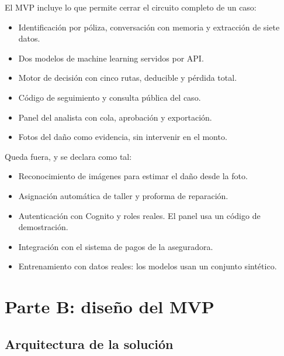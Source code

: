 \documentclass[12pt,letterpaper]{article}
\begin{document}
El MVP incluye lo que permite cerrar el circuito completo de un caso:

\begin{itemize}[itemsep=2pt]
  \item Identificación por póliza, conversación con memoria y extracción de siete datos.
  \item Dos modelos de machine learning servidos por API.
  \item Motor de decisión con cinco rutas, deducible y pérdida total.
  \item Código de seguimiento y consulta pública del caso.
  \item Panel del analista con cola, aprobación y exportación.
  \item Fotos del daño como evidencia, sin intervenir en el monto.
\end{itemize}

Queda fuera, y se declara como tal:

\begin{itemize}[itemsep=2pt]
  \item Reconocimiento de imágenes para estimar el daño desde la foto.
  \item Asignación automática de taller y proforma de reparación.
  \item Autenticación con Cognito y roles reales. El panel usa un código de demostración.
  \item Integración con el sistema de pagos de la aseguradora.
  \item Entrenamiento con datos reales: los modelos usan un conjunto sintético.
\end{itemize}

\clearpage
\section{Parte B: diseño del MVP}

\subsection{Arquitectura de la solución}
\end{document}
